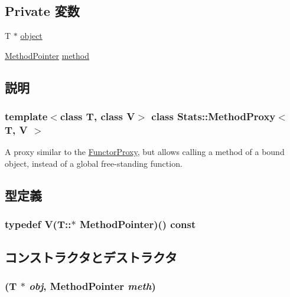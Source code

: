 \subsection*{Private 変数}
\begin{DoxyCompactItemize}
\item 
T $\ast$ \hyperlink{classStats_1_1MethodProxy_acd5a12b9b1a75e37fd605accfe038a03}{object}
\item 
\hyperlink{classStats_1_1MethodProxy_a731f64ce330eb760150e934a69327210}{MethodPointer} \hyperlink{classStats_1_1MethodProxy_a0c507c9bd3c94c998cf9948b6743434c}{method}
\end{DoxyCompactItemize}


\subsection{説明}
\subsubsection*{template$<$class T, class V$>$ class Stats::MethodProxy$<$ T, V $>$}

A proxy similar to the \hyperlink{classStats_1_1FunctorProxy}{FunctorProxy}, but allows calling a method of a bound object, instead of a global free-\/standing function. 

\subsection{型定義}
\hypertarget{classStats_1_1MethodProxy_a731f64ce330eb760150e934a69327210}{
\subsubsection[{MethodPointer}]{\setlength{\rightskip}{0pt plus 5cm}typedef V(T::$\ast$ {\bf MethodPointer})() const }}
\label{classStats_1_1MethodProxy_a731f64ce330eb760150e934a69327210}


\subsection{コンストラクタとデストラクタ}
\hypertarget{classStats_1_1MethodProxy_ab5b8549f1ee4086ccef8082ec75093f7}{
\subsubsection[{MethodProxy}]{ (T $\ast$ {\em obj}, \/  {\bf MethodPointer} {\em meth})}}
\label{classStats_1_1MethodProxy_ab5b8549f1ee4086ccef8082ec75093f7}



